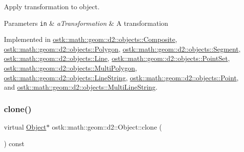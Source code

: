 Apply transformation to object. 


\begin{DoxyParams}[1]{Parameters}
\mbox{\tt in}  & {\em a\+Transformation} & A transformation \\
\hline
\end{DoxyParams}


Implemented in \hyperlink{classostk_1_1math_1_1geom_1_1d2_1_1objects_1_1_composite_ad7c787dc3c919a060e075902c0909413}{ostk\+::math\+::geom\+::d2\+::objects\+::\+Composite}, \hyperlink{classostk_1_1math_1_1geom_1_1d2_1_1objects_1_1_polygon_a00d04368f01daa0b234b403321453bbf}{ostk\+::math\+::geom\+::d2\+::objects\+::\+Polygon}, \hyperlink{classostk_1_1math_1_1geom_1_1d2_1_1objects_1_1_segment_afbd5fe1b8136f738a0e93b934b290394}{ostk\+::math\+::geom\+::d2\+::objects\+::\+Segment}, \hyperlink{classostk_1_1math_1_1geom_1_1d2_1_1objects_1_1_line_a75088e717153954f56cdd2df2087bdb6}{ostk\+::math\+::geom\+::d2\+::objects\+::\+Line}, \hyperlink{classostk_1_1math_1_1geom_1_1d2_1_1objects_1_1_point_set_a8c4140ca8434580a95df773d3aeed5bb}{ostk\+::math\+::geom\+::d2\+::objects\+::\+Point\+Set}, \hyperlink{classostk_1_1math_1_1geom_1_1d2_1_1objects_1_1_multi_polygon_a2dfac474c7787aac7ea0822e409bbff5}{ostk\+::math\+::geom\+::d2\+::objects\+::\+Multi\+Polygon}, \hyperlink{classostk_1_1math_1_1geom_1_1d2_1_1objects_1_1_line_string_afd26337c26696a0ff1b4b2e94e58f17c}{ostk\+::math\+::geom\+::d2\+::objects\+::\+Line\+String}, \hyperlink{classostk_1_1math_1_1geom_1_1d2_1_1objects_1_1_point_aa880df23e5ee93a60dad85597c600fb0}{ostk\+::math\+::geom\+::d2\+::objects\+::\+Point}, and \hyperlink{classostk_1_1math_1_1geom_1_1d2_1_1objects_1_1_multi_line_string_ada5fe5a183b6628831867b416901459e}{ostk\+::math\+::geom\+::d2\+::objects\+::\+Multi\+Line\+String}.

\mbox{\label{classostk_1_1math_1_1geom_1_1d2_1_1_object_a98dedc6792aef35308966ca768eb3e14}} 
\subsubsection{\texorpdfstring{clone()}{clone()}}
{\footnotesize\ttfamily virtual \hyperlink{classostk_1_1math_1_1geom_1_1d2_1_1_object}{Object}$\ast$ ostk\+::math\+::geom\+::d2\+::\+Object\+::clone (\begin{DoxyParamCaption}{ }\end{DoxyParamCaption}) const\hspace{0.3cm}{\ttfamily [pure virtual]}}



